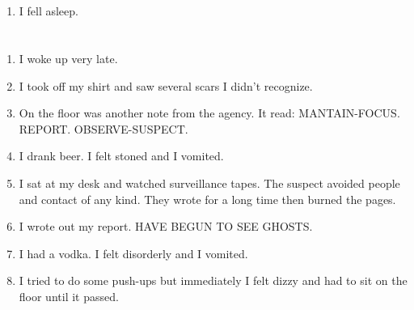 \documentclass{article}
\begin{document}
    \newpage
    
    \section{}
    
    \begin{enumerate}
    
    \item I fell asleep.\\
    
    \end{enumerate}
     
    \newpage
    
    \section{}
    
    \begin{enumerate}
    
    \item I woke up very late.\\
    
    \item I took off my shirt and saw several scars I didn't recognize.\\
    
    \item On the floor was another note from the agency. It read: MANTAIN-FOCUS. REPORT. OBSERVE-SUSPECT.\\
    
    \item I drank beer. I felt stoned and I vomited.\\
    
    \item I sat at my desk and watched surveillance tapes. The suspect avoided people and contact of any kind. They wrote for a long time then burned the pages.\\
    
    \item I wrote out my report. HAVE BEGUN TO SEE GHOSTS.\\
    
    \item I had a vodka. I felt disorderly and I vomited.\\
    
    \item I tried to do some push-ups but immediately I felt dizzy and had to sit on the floor until it passed.\\
    
    \end{enumerate}
     
\end{document}
